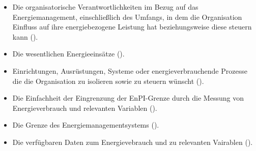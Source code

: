\begin{itemize}
    \item Die organisatorische Verantwortlichkeiten im Bezug auf das Energiemanagement, einschließlich des Umfangs, in dem die 
    Organisation Einfluss auf ihre energiebezogene Leistung hat beziehungsweise diese steuern kann (\cite[Kapitel 5.3]{DIN50006.2024}). 
    \item Die wesentlichen Energieeinsätze (\cite[Kapitel 5.3]{DIN50006.2024}). 
    \item Einrichtungen, Ausrüstungen, Systeme oder energieverbrauchende Prozesse die die Organisation zu isolieren sowie zu steuern wünscht (\cite[Kapitel 5.3]{DIN50006.2024}). 
    \item Die Einfachheit der Eingrenzung der EnPI-Grenze durch die Messung von Energieverbrauch und relevanten Variablen (\cite[Kapitel 5.3]{DIN50006.2024}). 
    \item Die Grenze des Energiemanagementsystems (\cite[Kapitel 5.3]{DIN50006.2024}). 
    \item Die verfügbaren Daten zum Energievebrauch und zu relevanten Vairablen (\cite[Kapitel 5.3]{DIN50006.2024}). 
\end{itemize}

